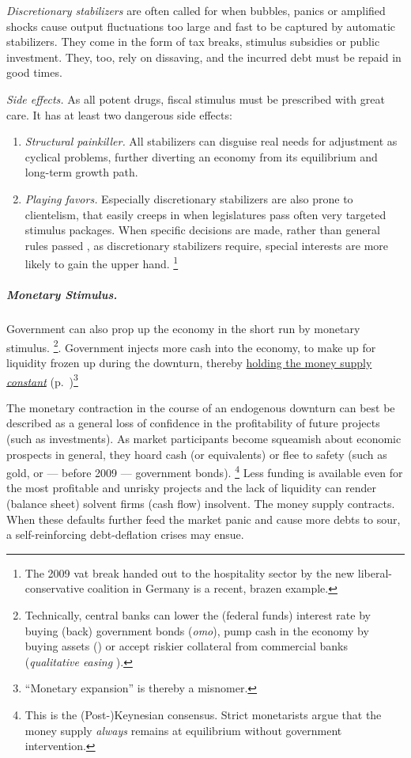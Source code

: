 \emph{Discretionary stabilizers}
are often called for when bubbles, panics or amplified shocks cause output fluctuations too large and fast to be captured by automatic stabilizers.
They come in the form of tax breaks, stimulus subsidies or public investment.
They, too, rely on dissaving, and the incurred debt must be repaid in good times.

\emph{Side effects.}
As all potent drugs, fiscal stimulus must be prescribed with great care.
It has at least two dangerous side effects:
\begin{enumerate}
	\item \emph{Structural painkiller.}
	All stabilizers can disguise real needs for adjustment as cyclical problems, further diverting an economy from its equilibrium and long-term growth path.

	\item \emph{Playing favors.}
	Especially discretionary stabilizers are also prone to clientelism, that easily creeps in when legislatures pass often very targeted stimulus packages.
	When specific decisions are made, rather than general rules passed \citep{Weber-1918-aa}, as discretionary stabilizers require, special interests are more likely to gain the upper hand.
	\footnote{
		The 2009 \gls{vat} break handed out to the hospitality sector by the new liberal-conservative coalition in Germany is a recent, brazen example.
	}
\end{enumerate}

\subparagraph{Monetary Stimulus.}
	 \label{sec:monetary-stimulus}
Government can also prop up the economy in the short run by monetary stimulus.
\footnote{
	Technically, central banks can lower the (federal funds) interest rate by buying (back) government bonds (\emph{\gls{omo}}), pump cash in the economy by buying assets () or accept riskier collateral from commercial banks (\emph{qualitative easing} \citep{Buiter2008}).}.
	Government injects more cash into the economy, to make up for liquidity frozen up during the downturn, thereby \hyperref[sec:price-stability]{holding the money supply \emph{constant}} (p.~\pageref{sec:price-stability})\footnote{
	``Monetary expansion'' is thereby a misnomer.
}

The monetary contraction in the course of an endogenous downturn can best be described as a general loss of confidence in the profitability of future projects (such as investments).
As market participants become squeamish about economic prospects in general, they hoard cash (or equivalents) or flee to safety (such as gold, or --- before 2009 --- government bonds).
\footnote{
	This is the (Post-)Keynesian consensus.
	Strict monetarists argue that the money supply \emph{always} remains at equilibrium without government intervention.
}
Less funding is available even for the most profitable and unrisky projects and the lack of liquidity can render (balance sheet) solvent firms (cash flow) insolvent.
The money supply contracts.
When these defaults further feed the market panic and cause more debts to sour, a self-reinforcing debt-deflation crises may ensue.


